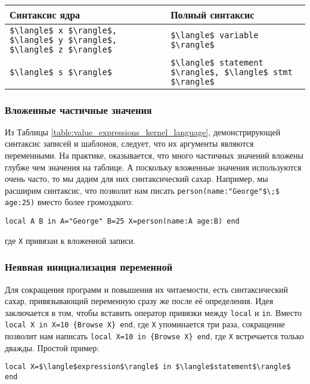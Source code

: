 ~\\

  \begin{tabular}{ll}
    Синтаксис ядра & Полный синтаксис\\
    \hline
    \lstinline|$\langle$ x $\rangle$, $\langle$ y $\rangle$, $\langle$ z $\rangle$| & \lstinline|$\langle$ variable $\rangle$| \\
    \lstinline|$\langle$ s $\rangle$| & \lstinline|$\langle$ statement $\rangle$, $\langle$ stmt $\rangle$| \\
  \end{tabular}





\subsubsection{Вложенные частичные значения}

Из Таблицы \ref{table:value_expressions_kernel_language}, демонстрирующей синтаксис записей и шаблонов, следует, что их аргументы являются переменными. На практике, оказывается, что много частичных значений вложены глубже чем значения на таблице. А поскольку вложенные значения используются очень часто, то мы дадим для них синтаксический сахар. Например, мы расширим синтаксис, что позволит нам писать \lstinline|person(name:"George"$\;$ age:25)| вместо более громоздкого:

\begin{lstlisting}
local A B in A="George" B=25 X=person(name:A age:B) end
\end{lstlisting}

где \lstinline|X| привязан к вложенной записи.

\subsubsection{Неявная инициализация переменной}

Для сокращения программ и повышения их читаемости, есть синтаксический сахар, привязывающий переменную сразу же после её определения. Идея заключается в том, чтобы вставить оператор привязки между \lstinline|local| и \lstinline|in|. Вместо \lstinline|local X in X=10 {Browse X} end|, где \lstinline|X| упоминается три раза, сокращение позволит нам написать \lstinline|local X=10 in {Browse X} end|, где \lstinline|X| встречается только дважды. Простой пример:

\begin{lstlisting}
local X=$\langle$expression$\rangle$ in $\langle$statement$\rangle$ end
\end{lstlisting}

